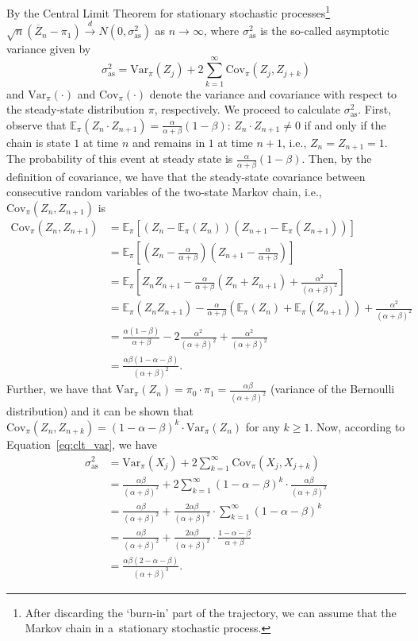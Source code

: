 \documentclass[runningheads,a4paper]{llncs}
\newcommand{\E}{\mathbb{E}}
\newcommand{\Var}{\textrm{Var}}
\newcommand{\Cov}{\textrm{Cov}}
\begin{document}
By the Central Limit Theorem for stationary stochastic processes\footnote{After discarding the
`burn-in' part of the trajectory, we can assume that the Markov chain in a~stationary stochastic
process.} $\sqrt{n}(\overline{Z}_n-\pi_1)\xrightarrow{d}N(0,\sigma_{\textrm{as}}^2)$ as
$n\to\infty$, where $\sigma_{\textrm{as}}^2$ is the so-called asymptotic variance given by
\begin{equation}
\label{eq:clt_var}
\sigma_{\textrm{as}}^2 = \Var_\pi(Z_j) + 2\sum_{k=1}^\infty \Cov_\pi(Z_j,Z_{j+k})
\end{equation}
and $\Var_\pi(\cdot)$ and $\Cov_\pi(\cdot)$ denote the variance and covariance with respect to the
steady-state distribution $\pi$, respectively. We proceed to calculate $\sigma_{\textrm{as}}^2$.
First, observe that $\E_\pi(Z_n\cdot Z_{n+1}) = \frac{\alpha}{\alpha+\beta}(1-\beta)$: $Z_n\cdot
Z_{n+1} \neq 0$ if and only if the chain is state $1$ at time $n$ and remains in $1$ at time
$n+1$, i.e., $Z_n = Z_{n+1} = 1$. The probability of this event at steady state is
$\frac{\alpha}{\alpha+\beta}(1-\beta)$. Then, by the definition of covariance, we have that the
steady-state covariance between consecutive random variables of the two-state Markov chain, i.e., $\Cov_\pi(Z_{n},Z_{n+1})$ is
\begin{align*}
\Cov_\pi(Z_{n},Z_{n+1})&=\E_\pi\left[(Z_{n}-\E_\pi(Z_{n}))(Z_{n+1}-\E_\pi(Z_{n+1}))\right]\\
&=\E_\pi\left[(Z_n-\frac{\alpha}{\alpha+\beta})(Z_{n+1}-\frac{\alpha}{\alpha+\beta})\right]\\
&=\E_\pi\left[Z_nZ_{n+1}-\frac{\alpha}{\alpha+\beta}(Z_n+Z_{n+1})+
  \frac{\alpha^2}{(\alpha+\beta)^2}\right]\\
&=\E_\pi(Z_nZ_{n+1})-\frac{\alpha}{\alpha+\beta}(\E_\pi(Z_n)+\E_\pi(Z_{n+1}))
  +\frac{\alpha^2}{(\alpha+\beta)^2}\\
&=\frac{\alpha(1-\beta)}{\alpha+\beta}-2\frac{\alpha^2}{(\alpha+\beta)^2}
  +\frac{\alpha^2}{(\alpha+\beta)^2}\\
&=\frac{\alpha\beta(1-\alpha-\beta)}{(\alpha+\beta)^2}.
\end{align*}
Further, we have that
$\Var_\pi(Z_n)=\pi_{0} \cdot \pi_1=\frac{\alpha\beta}{(\alpha+\beta)^2}$ (variance of the
Bernoulli distribution) and it can be shown that
$\Cov_\pi(Z_{n},Z_{n+k})=(1-\alpha-\beta)^k\cdot \Var_\pi(Z_{n})$ for any $k\geq 1$. Now,
according to Equation~\eqref{eq:clt_var}, we have
\begin{align*}
\sigma_{\textrm{as}}^2&=\Var_\pi(X_j) + 2\sum_{k=1}^\infty \Cov_\pi(X_j,X_{j+k})\\
&=\frac{\alpha\beta}{(\alpha+\beta)^2}+2\sum_{k=1}^\infty(1-\alpha-\beta)^k
  \cdot\frac{\alpha\beta}{(\alpha+\beta)^2}\\
&=\frac{\alpha\beta}{(\alpha+\beta)^2}+\frac{2\alpha\beta}{(\alpha+\beta)^2}
  \cdot\sum_{k=1}^\infty(1-\alpha-\beta)^k\\
&=\frac{\alpha\beta}{(\alpha+\beta)^2}+\frac{2\alpha\beta}{(\alpha+\beta)^2}
  \cdot\frac{1-\alpha-\beta}{\alpha+\beta}\\
&=\frac{\alpha\beta(2-\alpha-\beta)}{(\alpha+\beta)^3}.
\end{align*}
\end{document}
